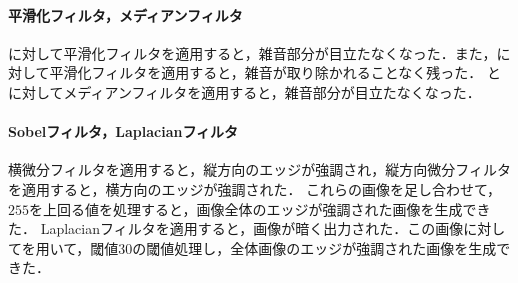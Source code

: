 \paragraph{平滑化フィルタ，メディアンフィルタ}
\wgnimg に対して平滑化フィルタを適用すると，雑音部分が目立たなくなった．また，\inimg に対して平滑化フィルタを適用すると，雑音が取り除かれることなく残った．
\wgnimg と\inimg に対してメディアンフィルタを適用すると，雑音部分が目立たなくなった．
\paragraph{Sobelフィルタ，Laplacianフィルタ}
横微分フィルタを適用すると，縦方向のエッジが強調され，縦方向微分フィルタを適用すると，横方向のエッジが強調された．
これらの画像を足し合わせて，\(255\)を上回る値を処理すると，画像全体のエッジが強調された画像を生成できた．
Laplacianフィルタを適用すると，画像が暗く出力された．この画像に対してを用いて，閾値\(30\)の閾値処理し，全体画像のエッジが強調された画像を生成できた．